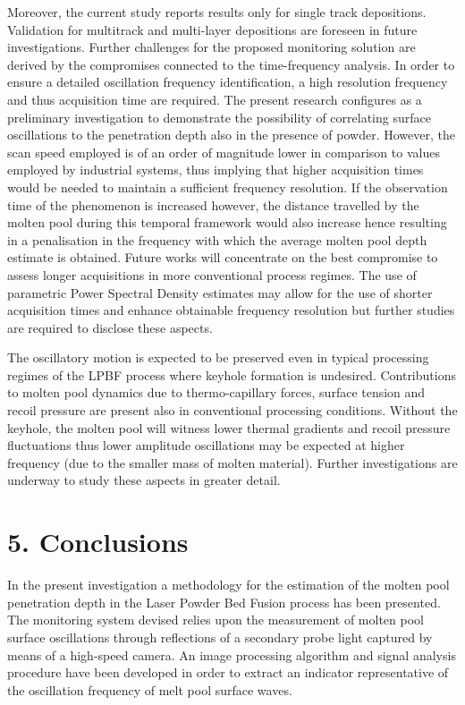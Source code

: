 \documentclass[10pt]{article}
\begin{document}
Moreover, the current study reports results only for single track depositions. Validation for multitrack and multi-layer depositions are foreseen in future investigations. Further challenges for the proposed monitoring solution are derived by the compromises connected to the time-frequency analysis. In order to ensure a detailed oscillation frequency identification, a high resolution frequency and thus acquisition time are required. The present research configures as a preliminary investigation to demonstrate the possibility of correlating surface oscillations to the penetration depth also in the presence of powder. However, the scan speed employed is of an order of magnitude lower in comparison to values employed by industrial systems, thus implying that higher acquisition times would be needed to maintain a sufficient frequency resolution. If the observation time of the phenomenon is increased however, the distance travelled by the molten pool during this temporal framework would also increase hence resulting in a penalisation in the frequency with which the average molten pool depth estimate is obtained. Future works will concentrate on the best compromise to assess longer acquisitions in more conventional process regimes. The use of parametric Power Spectral Density estimates may allow for the use of shorter acquisition times and enhance obtainable frequency resolution but further studies are required to disclose these aspects.

The oscillatory motion is expected to be preserved even in typical processing regimes of the LPBF process where keyhole formation is undesired. Contributions to molten pool dynamics due to thermo-capillary forces, surface tension and recoil pressure are present also in conventional processing conditions. Without the keyhole, the molten pool will witness lower thermal gradients and recoil pressure fluctuations thus lower amplitude oscillations may be expected at higher frequency (due to the smaller mass of molten material). Further investigations are underway to study these aspects in greater detail.

\section*{5. Conclusions}
In the present investigation a methodology for the estimation of the molten pool penetration depth in the Laser Powder Bed Fusion process has been presented. The monitoring system devised relies upon the measurement of molten pool surface oscillations through reflections of a secondary probe light captured by means of a high-speed camera. An image processing algorithm and signal analysis procedure have been developed in order to extract an indicator representative of the oscillation frequency of melt pool surface waves.
\end{document}
